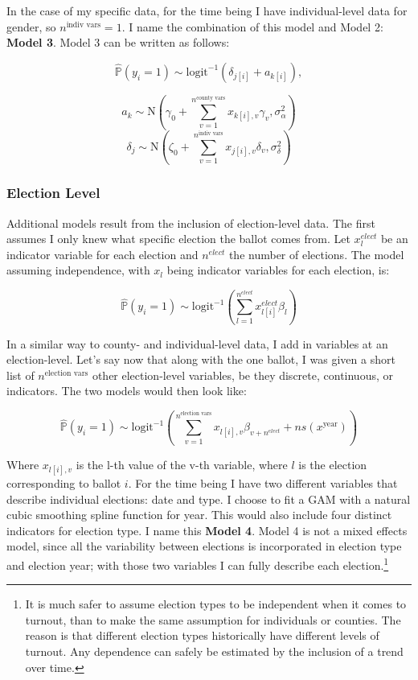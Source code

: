 \documentclass[12pt,twoside]{reedthesis}
\begin{document}
  In the case of my specific data, for the time being I have
  individual-level data for gender, so \(n^{\text{indiv vars}} = 1\). I
  name the combination of this model and Model 2: \textbf{Model 3}. Model
  3 can be written as follows:
  
  \begin{equation} \tag{Model 3}
  \hat{\mathbb{P}}(y_i = 1) \sim \text{logit}^{-1}(\delta_{j[i]} + a_{k[i]}), 
  \end{equation}
  
  \[a_{k} \sim \text{N}(\gamma_0 + \sum_{v=1}^{n^{\text{county vars}}}x_{k[i], v}\gamma_{v}, \sigma_{\alpha}^2)\]
  \[\delta_{j} \sim \text{N}(\zeta_0 + \sum_{v=1}^{n^{\text{indiv vars}}}x_{j[i], v}\delta_{v}, \sigma_{\delta}^2)\]
  
  \subsubsection{Election Level}\label{election-level}
  
  Additional models result from the inclusion of election-level data. The
  first assumes I only knew what specific election the ballot comes from.
  Let \(x_{l}^{elect}\) be an indicator variable for each election and
  \(n^{elect}\) the number of elections. The model assuming independence,
  with \(x_{l}\) being indicator variables for each election, is:
  
  \[\hat{\mathbb{P}}(y_i = 1) \sim \text{logit}^{-1}(\sum_{l = 1}^{n^{elect}}x_{l[i]}^{elect}\beta_{l})\]
  
  In a similar way to county- and individual-level data, I add in
  variables at an election-level. Let's say now that along with the one
  ballot, I was given a short list of \(n^{\text{election vars}}\) other
  election-level variables, be they discrete, continuous, or indicators.
  The two models would then look like:
  
  \begin{equation} \tag{Model 4}
  \hat{\mathbb{P}}(y_i = 1) \sim \text{logit}^{-1}(\sum_{v=1}^{n^{\text{election vars}}}x_{l[i], v}\beta_{v+n^{elect}} + ns(x^{\text{year}}))
  \end{equation}
  
  Where \(x_{l[i], v}\) is the l-th value of the v-th variable, where
  \(l\) is the election corresponding to ballot \(i\). For the time being
  I have two different variables that describe individual elections: date
  and type. I choose to fit a GAM with a natural cubic smoothing spline
  function for year. This would also include four distinct indicators for
  election type. I name this \textbf{Model 4}. Model 4 is not a mixed
  effects model, since all the variability between elections is
  incorporated in election type and election year; with those two
  variables I can fully describe each election.\footnote{It is much safer
    to assume election types to be independent when it comes to turnout,
    than to make the same assumption for individuals or counties. The
    reason is that different election types historically have different
    levels of turnout. Any dependence can safely be estimated by the
    inclusion of a trend over time.}
  
\end{document}
